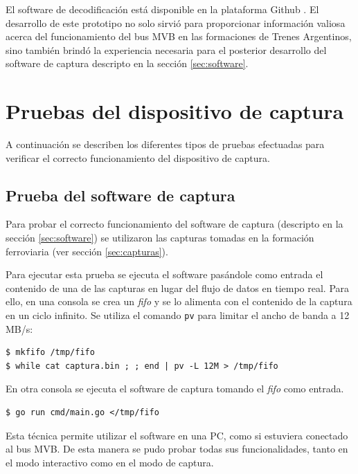 El software de decodificación está disponible en la plataforma Github \cite{mvbparse-py}. El desarrollo de este prototipo no solo sirvió para proporcionar información valiosa acerca del funcionamiento del bus MVB en las formaciones de Trenes Argentinos, sino también brindó la experiencia necesaria para el posterior desarrollo del software de captura descripto en la sección \ref{sec:software}.

\section{Pruebas del dispositivo de captura}

A continuación se describen los diferentes tipos de pruebas efectuadas para verificar el correcto funcionamiento del dispositivo de captura.

\subsection{Prueba del software de captura}

Para probar el correcto funcionamiento del software de captura (descripto en la sección \ref{sec:software}) se utilizaron las capturas tomadas en la formación ferroviaria (ver sección \ref{sec:capturas}).

Para ejecutar esta prueba se ejecuta el software pasándole como entrada el contenido de una de las capturas en lugar del flujo de datos en tiempo real. Para ello, en una consola se crea un \textit{fifo} y se lo alimenta con el contenido de la captura en un ciclo infinito. Se utiliza el comando \texttt{pv} \cite{pv} para limitar el ancho de banda a 12 MB/s:

\begin{lstlisting}[basicstyle=\small,breaklines=true,backgroundcolor=\color{light-gray}]
$ mkfifo /tmp/fifo
$ while cat captura.bin ; ; end | pv -L 12M > /tmp/fifo
\end{lstlisting}

En otra consola se ejecuta el software de captura tomando el \textit{fifo} como entrada.

\begin{lstlisting}[basicstyle=\small,breaklines=true,backgroundcolor=\color{light-gray}]
$ go run cmd/main.go </tmp/fifo
\end{lstlisting}

Esta técnica permite utilizar el software en una PC, como si estuviera conectado al bus MVB.
De esta manera se pudo probar todas sus funcionalidades, tanto en el modo interactivo como en el modo de captura.


